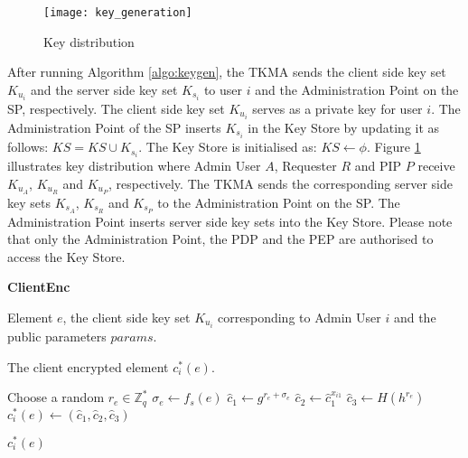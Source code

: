 \documentclass[final,5p,times,twocolumn]{elsarticle}
\newcommand{\algofontsize}{\fontsize{7}{8}\selectfont}
\begin{document}
\begin{figure}
\centering
\texttt{[image: key\_generation]} \caption{Key distribution}
\label{fig:key_generation}
\end{figure}


After running Algorithm \ref{algo:keygen}, the TKMA sends the client side key set $K_{u_i}$ and the server side key set $K_{s_i}$ to user $i$ and the Administration Point on the SP, respectively. The client side key set $K_{u_i}$ serves as a private key for user $i$. The Administration Point of the SP inserts $K_{s_i}$ in the Key Store by updating it as follows: $KS = KS \cup K_{s_i}$. The Key Store is initialised as: $KS \leftarrow \phi$. Figure \ref{fig:key_generation} illustrates key distribution where Admin User $A$, Requester $R$ and PIP $P$ receive $K_{u_A}$, $K_{u_R}$ and $K_{u_P}$, respectively. The TKMA sends the corresponding server side key sets $K_{s_A}$, $K_{s_R}$ and $K_{s_P}$ to the Administration Point on the SP. The Administration Point inserts server side key sets into the Key Store. Please note that only the Administration Point, the PDP and the PEP are authorised to access the Key Store.






\begin{algorithm}[htp]
{\algofontsize
\caption{\textbf{ClientEnc}}

\label{algo:client-enc}

\begin{algorithmic}[1]

\REQUIRE Element $e$, the client side key set $K_{u_i}$ corresponding to Admin User $i$ and the public parameters $params$.

\ENSURE The client encrypted element $c^*_i (e)$.

\medskip

\STATE Choose a random $r_e \in \mathbb{Z}^*_q$ \label{line:ce-r}
\STATE ${\sigma}_e \leftarrow f_s (e)$ \label{line:ce-sigma}
\STATE $\hat{c}_1 \leftarrow g^{r_e+{\sigma}_e}$ \label{line:ce-c1}
\STATE $\hat{c}_2 \leftarrow \hat{c}_1^{x_{i1}}$ \label{line:ce-c2}
\STATE $\hat{c}_3 \leftarrow H(h^{r_e})$ \label{line:ce-c3}
\STATE $c^*_i (e) \leftarrow (\hat{c}_1, \hat{c}_2, \hat{c}_3)$ \label{line:ce-c}

\RETURN $c^*_i (e)$

\end{algorithmic}
}
\end{algorithm}
\end{document}
